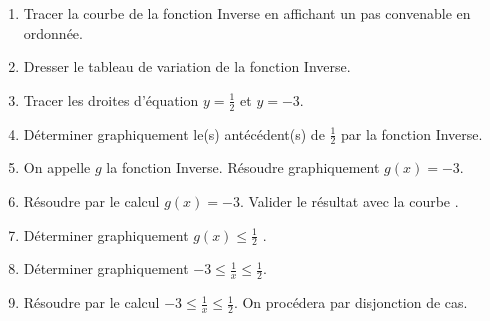 
\begin{enumerate}
\item Tracer la courbe de la fonction Inverse en affichant un pas convenable en ordonnée.
\item  Dresser le tableau de variation de la fonction Inverse.
\item  Tracer les droites d'équation $y=\frac{1}{2}$ et $y=-3$.
\item  Déterminer graphiquement le(s) antécédent(s) de  $\frac{1}{2}$ par la fonction Inverse. 
\item  On appelle $g$ la fonction Inverse. Résoudre graphiquement $g(x)=-3$.
\item  Résoudre par le calcul $g(x)=-3$. Valider le résultat avec la courbe .
\item  Déterminer graphiquement $g(x)\leq \frac{1}{2}$ . 
\item  Déterminer graphiquement $-3 \leq \frac{1}{x} \leq \frac{1}{2}$. 
\item  Résoudre par le calcul $-3 \leq \frac{1}{x} \leq \frac{1}{2}$. On procédera par disjonction de cas.
\end{enumerate}
